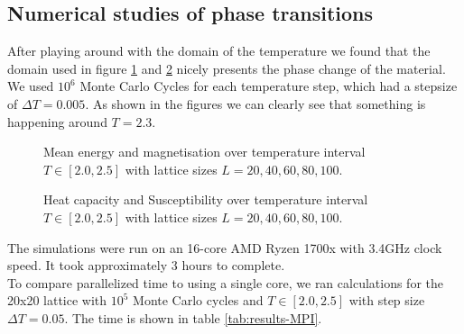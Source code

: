 \documentclass[../main.tex]{subfiles}
\begin{document}
\subsection{Numerical studies of phase transitions}
After playing around with the domain of the temperature we found that the domain used in figure \ref{fig:results-energy-magnetisation} and \ref{fig:results-heatcap-suscep} nicely presents the phase change of the material. We used $10^6$ Monte Carlo Cycles for each temperature step, which had a stepsize of $\Delta T = 0.005$. As shown in the figures we can clearly see that something is happening around $T = 2.3$.

\begin{figure}[!h]
  \caption{Mean energy and magnetisation over temperature interval $T \in [2.0, 2.5]$ with lattice sizes $L = {20, 40, 60, 80, 100}$.}
  \label{fig:results-energy-magnetisation}
\end{figure}
\FloatBarrier

\begin{figure}[!h]
  \caption{Heat capacity and Susceptibility over temperature interval $T \in [2.0, 2.5]$ with lattice sizes $L = {20, 40, 60, 80, 100}$.}
  \label{fig:results-heatcap-suscep}
\end{figure}
\FloatBarrier
The simulations were run on an 16-core AMD Ryzen 1700x with 3.4GHz clock speed. It took approximately 3 hours to complete.\\
To compare parallelized time to using a single core, we ran calculations for the 20x20 lattice with $10^5$ Monte Carlo cycles and $T \in [2.0, 2.5]$ with step size $\Delta T = 0.05$. The time is shown in table \ref{tab:results-MPI}.
\end{document}
